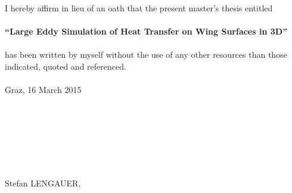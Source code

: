 I hereby affirm in lieu of an oath that the present master’s thesis entitled\\
\\
\textbf{``Large Eddy Simulation of Heat Transfer on Wing Surfaces in 3D''}\\
\\
has been written by myself without the use of any other resources than those indicated, quoted and referenced.\\
\\
Graz, 16 March 2015\\
\\
\\
\\
\\
\\
\\
\\
Stefan LENGAUER,
